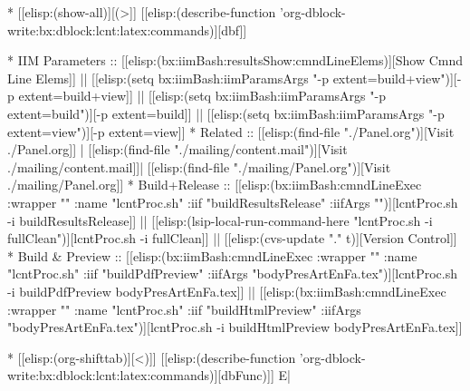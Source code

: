 \begin{whenOrg}
* [[elisp:(show-all)][(>]] [[elisp:(describe-function 'org-dblock-write:bx:dblock:lcnt:latex:commands)][dbf]]
\begin{whenOrg}
*      IIM Parameters    ::  [[elisp:(bx:iimBash:resultsShow:cmndLineElems)][Show Cmnd Line Elems]] || [[elisp:(setq bx:iimBash:iimParamsArgs "-p extent=build+view")][-p extent=build+view]] || [[elisp:(setq bx:iimBash:iimParamsArgs "-p extent=build")][-p extent=build]] || [[elisp:(setq bx:iimBash:iimParamsArgs "-p extent=view")][-p extent=view]]
*      Related           ::  [[elisp:(find-file "./Panel.org")][Visit ./Panel.org]] | [[elisp:(find-file "./mailing/content.mail")][Visit ./mailing/content.mail]]| [[elisp:(find-file "./mailing/Panel.org")][Visit ./mailing/Panel.org]]
*      Build+Release     ::  [[elisp:(bx:iimBash:cmndLineExec :wrapper "" :name "lcntProc.sh" :iif "buildResultsRelease" :iifArgs "")][lcntProc.sh -i buildResultsRelease]] || [[elisp:(lsip-local-run-command-here "lcntProc.sh -i fullClean")][lcntProc.sh -i fullClean]] || [[elisp:(cvs-update "." t)][Version Control]]
*      Build & Preview   ::  [[elisp:(bx:iimBash:cmndLineExec :wrapper "" :name "lcntProc.sh" :iif "buildPdfPreview" :iifArgs "bodyPresArtEnFa.tex")][lcntProc.sh -i buildPdfPreview bodyPresArtEnFa.tex]] || [[elisp:(bx:iimBash:cmndLineExec :wrapper "" :name "lcntProc.sh" :iif "buildHtmlPreview" :iifArgs "bodyPresArtEnFa.tex")][lcntProc.sh -i buildHtmlPreview bodyPresArtEnFa.tex]]

* [[elisp:(org-shifttab)][<)]] [[elisp:(describe-function 'org-dblock-write:bx:dblock:lcnt:latex:commands)][dbFunc)]]  E|
\end{whenOrg}

\end{whenOrg}
